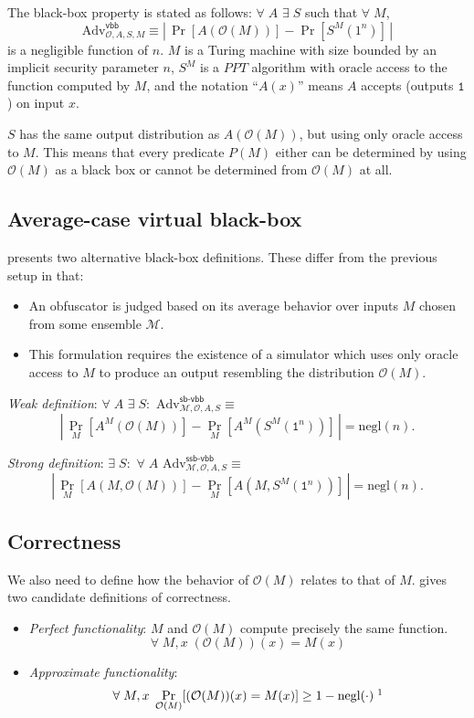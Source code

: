 \documentclass[10pt,twocolumn]{article}
\newcommand{\abs}[1]{{\ensuremath{\left\vert\,#1\,\right\vert}}}
\def\one{\texttt{1}}
\def\ppt{\textit{PPT}}
\def\obf{\ensuremath{\mathcal{O}}}
\def\negl{\text{negl}}
\def\Adv{\text{Adv}}
\def\vbb{\textsf{vbb}}
\def\sbvbb{\textsf{sb-vbb}}
\def\ssbvbb{\textsf{ssb-vbb}}
\begin{document}
    The black-box property is stated as follows:
    $\forall\;A$ $\exists\;S$ such that $\forall\;M$,
    \[ \Adv^\vbb_{\obf,A,S,M} \equiv \abs{ \Pr[ A(\obf(M)) ] - \Pr[ S^M(1^n) ] } \]
    is a negligible function of $n$.
    $M$ is a Turing machine with size bounded by an implicit security parameter $n$,
    $S^M$ is a $\ppt$ algorithm with oracle access to the function computed by $M$,
    and the notation ``$A(x)$'' means $A$ accepts (outputs $\one$) on input $x$.

    $S$ has the same output distribution as $A(\obf(M))$, but using only oracle access to $M$.
    This means that every predicate $P(M)$ either can be determined by using $\obf(M)$ as a black box
    or cannot be determined from $\obf(M)$ at all.

  \subsection{Average-case virtual black-box} \label{sec:sim-bb}

    \cite{forCryptoPurposes} presents two alternative black-box definitions.
    These differ from the previous setup in that:
    \begin{itemize}
      \item
        An obfuscator is judged based on its average behavior over inputs $M$
        chosen from some ensemble $\mathcal{M}$.
      \item
        This formulation requires the existence of a simulator which uses only oracle access
        to $M$ to produce an output resembling the distribution $\obf(M)$.
    \end{itemize}

    \textit{Weak definition}: $\forall\;A$ $\exists\;S :$
    $\Adv^\sbvbb_{\mathcal{M},\obf,A,S} \equiv$
    \[\abs{
      \Pr_{M} [ A^{M}(\obf(M)) ] -
      \Pr_{M} [ A^{M}(S^M(\one^n)) ]
    }=\negl(n).\]

    \textit{Strong definition}: $\exists\;S :$ $\forall\;A$
    $\Adv^\ssbvbb_{\mathcal{M},\obf,A,S} \equiv$
    \[\abs{
      \Pr_{M} [ A(M,\obf(M)) ] -
      \Pr_{M} [ A(M,S^M(\one^n)) ]
    }=\negl(n).\]

  \subsection{Correctness}

    We also need to define how the behavior of $\obf(M)$ relates to that of $M$.
    \cite{onThe(Im)possibility} gives two candidate definitions of correctness.
    \begin{itemize}

      \item
        \textit{Perfect functionality}:
        $M$ and $\obf(M)$ compute precisely the same function.
        \[ \forall\;M,x\;(\obf(M))(x) = M(x) \]

      \item
        \textit{Approximate functionality}:
        \[ \forall\;M,x\;\Pr_{\obf(M)}[(\obf(M))(x) = M(x)] \ge 1-\negl(\cdot) \;\footnotemark \]

    \end{itemize}
\end{document}
